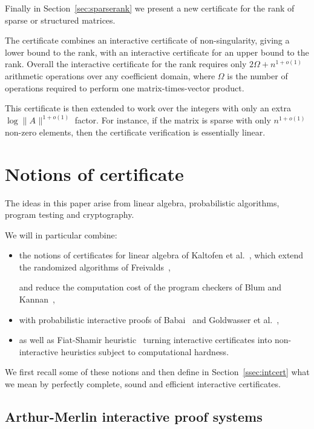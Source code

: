 \documentclass{article}
\newcommand{\lognormA}{\log\| A\mspace{1mu} \|}
\begin{document}
Finally in Section~\ref{sec:sparserank} we present a new certificate for the
rank of sparse or structured matrices.
 
The certificate combines an interactive certificate of non-singularity,
giving a lower bound to the rank, with an interactive certificate for an upper
bound to the rank.
Overall the interactive certificate for the rank requires only
$2\Omega+n^{1+o(1)}$ arithmetic operations over any coefficient domain,
where $\Omega$ is the number of operations required to perform one
matrix-times-vector product. 
 
This certificate is then extended to work over the integers with only an extra $\lognormA^{1+o(1)}$ factor.
For instance, if the matrix is sparse with only $n^{1+o(1)}$
non-zero elements, then the certificate verification is essentially linear.

\section{Notions of certificate}\label{sec:notions}
The ideas in this paper arise from linear algebra, probabilistic algorithms,
program testing and cryptography. 

We will in particular combine:
\begin{itemize}
\item the notions of
certificates for linear algebra of Kaltofen et al.~\cite{Kaltofen:2011:quadcert},
which extend the randomized algorithms of Freivalds~\cite{Freivalds:1979:certif},
 
and reduce the computation cost of the program checkers of
Blum and Kannan~\cite{Blum:1995:checkwork},

\item with probabilistic interactive proofs of
Babai~\cite{Babai:1985:arthurmerlin} and Goldwasser et
al.~\cite{Goldwasser:1985:IPclass},
\item  as well as Fiat-Shamir
heuristic~\cite{Fiat:1986:Shamir,Bellare:1993:randomoracle} turning interactive
certificates into non-interactive heuristics subject to computational hardness.
\end{itemize}

We first recall some of these notions and then define
in Section~\ref{ssec:intcert} what we mean by perfectly complete, sound and
efficient interactive certificates.

\subsection{Arthur-Merlin interactive proof systems}
 
\end{document}
